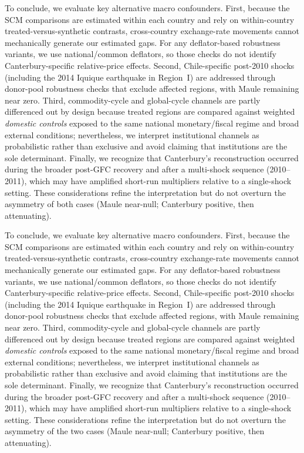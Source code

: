 \documentclass[12pt]{article}
\begin{document}
To conclude, we evaluate key alternative macro confounders. First, because the SCM comparisons are estimated within each country and rely on within-country treated-versus-synthetic contrasts, cross-country exchange-rate movements cannot mechanically generate our estimated gaps. For any deflator-based robustness variants, we use national/common deflators, so those checks do not identify Canterbury-specific relative-price effects. Second, Chile-specific post-2010 shocks (including the 2014 Iquique earthquake in Region~I) are addressed through donor-pool robustness checks that exclude affected regions, with Maule remaining near zero. Third, commodity-cycle and global-cycle channels are partly differenced out by design because treated regions are compared against weighted \textit{domestic controls} exposed to the same national monetary/fiscal regime and broad external conditions; nevertheless, we interpret institutional channels as probabilistic rather than exclusive and avoid claiming that institutions are the sole determinant. Finally, we recognize that Canterbury’s reconstruction occurred during the broader post-GFC recovery and after a multi-shock sequence (2010--2011), which may have amplified short-run multipliers relative to a single-shock setting. These considerations refine the interpretation but do not overturn the asymmetry of both cases (Maule near-null; Canterbury positive, then attenuating).

\fi

To conclude, we evaluate key alternative macro confounders. First, because the SCM comparisons are estimated within each country and rely on within-country treated-versus-synthetic contrasts, cross-country exchange-rate movements cannot mechanically generate our estimated gaps. For any deflator-based robustness variants, we use national/common deflators, so those checks do not identify Canterbury-specific relative-price effects. Second, Chile-specific post-2010 shocks (including the 2014 Iquique earthquake in Region~I) are addressed through donor-pool robustness checks that exclude affected regions, with Maule remaining near zero. Third, commodity-cycle and global-cycle channels are partly differenced out by design because treated regions are compared against weighted \textit{domestic controls} exposed to the same national monetary/fiscal regime and broad external conditions; nevertheless, we interpret institutional channels as probabilistic rather than exclusive and avoid claiming that institutions are the sole determinant. Finally, we recognize that Canterbury's reconstruction occurred during the broader post-GFC recovery and after a multi-shock sequence (2010--2011), which may have amplified short-run multipliers relative to a single-shock setting. These considerations refine the interpretation but do not overturn the asymmetry of the two cases (Maule near-null; Canterbury positive, then attenuating).
\end{document}
